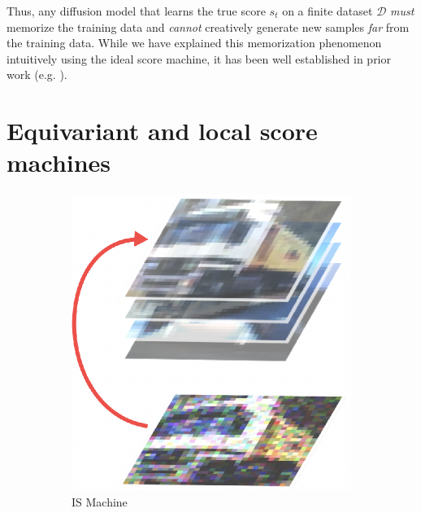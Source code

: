 \documentclass{article}
\theoremstyle{plain}
\theoremstyle{definition}
\theoremstyle{remark}
\begin{document}
Thus, any diffusion model that learns the true score $s_t$ on a finite dataset $\mathcal D$ {\it must} memorize the training data and {\it cannot} creatively generate new samples {\it far} from the training data.  While we have explained this memorization phenomenon intuitively using the ideal score machine, it has been well established in prior work (e.g. \cite{biroli2024dynamical}).   


\section{Equivariant and local score machines}
\label{sec:equivlocal}

\begin{figure}[t]
\centering


\begin{subfigure}[t]{0.368\linewidth}
\captionsetup{justification=centering,singlelinecheck=off}
\includegraphics[width=\linewidth]{IS1.png}
\caption{IS Machine}
\label{fig:els-machine-structurea}
\end{subfigure} %
\begin{subfigure}[t]{0.2875\linewidth} 
\captionsetup{justification=centering,singlelinecheck=off}

\end{subfigure}
\end{figure}
\end{document}
